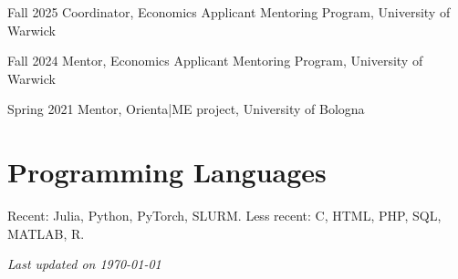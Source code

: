\documentclass[11pt,a4paper]{article}
\begin{document}
\begin{cvenumerate}
    \item[Fall 2025] Coordinator, Economics Applicant Mentoring Program, University of Warwick
    \item[Fall 2024] Mentor, Economics Applicant Mentoring Program, University of Warwick
    \item[Spring 2021] Mentor, Orienta|ME project, University of Bologna
\end{cvenumerate}

\section{Programming Languages}

Recent: Julia, Python, PyTorch, SLURM. Less recent: C, HTML, PHP, SQL, MATLAB, R.

\begin{flushright}
    \textit{Last updated on \today}
\end{flushright}
\end{document}
